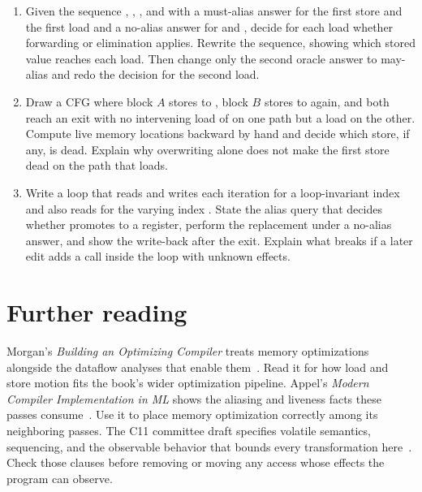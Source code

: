 \begin{enumerate}
  \item \label{ex:ch21-forward-vs-elim}
  Given the sequence , , , and  with a must-alias answer for the first store and the first load and a no-alias answer for  and , decide for each load whether forwarding or elimination applies.
  Rewrite the sequence, showing which stored value reaches each load.
  Then change only the second oracle answer to may-alias and redo the decision for the second load.
  \item \label{ex:ch21-dead-store}
  Draw a CFG where block $A$ stores to , block $B$ stores to  again, and both reach an exit with no intervening load of  on one path but a load on the other.
  Compute live memory locations backward by hand and decide which store, if any, is dead.
  Explain why overwriting alone does not make the first store dead on the path that loads.
  \item \label{ex:ch21-scalar-replace}
  Write a loop that reads and writes  each iteration for a loop-invariant index  and also reads  for the varying index .
  State the alias query that decides whether  promotes to a register, perform the replacement under a no-alias answer, and show the write-back after the exit.
  Explain what breaks if a later edit adds a call inside the loop with unknown effects.
\end{enumerate}

\section{Further reading}
\label{sec:ch21-further-reading}

Morgan's \emph{Building an Optimizing Compiler} treats memory optimizations alongside the dataflow analyses that enable them~\cite{morgan-1998-optimizing}.
Read it for how load and store motion fits the book's wider optimization pipeline.
Appel's \emph{Modern Compiler Implementation in ML} shows the aliasing and liveness facts these passes consume~\cite{appel-1998-modern}.
Use it to place memory optimization correctly among its neighboring passes.
The C11 committee draft specifies volatile semantics, sequencing, and the observable behavior that bounds every transformation here~\cite{wg14-2011-c11}.
Check those clauses before removing or moving any access whose effects the program can observe.

